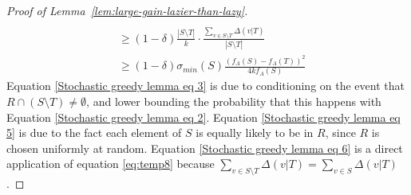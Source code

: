 \documentclass{article}
\begin{document}
\begin{proof}[Proof of Lemma~\ref{lem:large-gain-lazier-than-lazy}]
\begin{align}
\\ &\geq (1 - \delta) \frac{|S \setminus T|}{k} \cdot \frac{\sum_{v \in S \setminus T} \Delta(v | T)}{|S \setminus T|} \label{Stochastic greedy lemma eq 5}
\\ &\geq (1 - \delta) \sigma_{min}(S) \frac{(f_A(S)- f_A(T))^2}{4kf_A(S)} \label{Stochastic greedy lemma eq 6}
\end{align}
Equation \eqref{Stochastic greedy lemma eq 3} is due to conditioning on the event that $R \cap (S \setminus T) \neq \emptyset$, and lower bounding the probability that this happens with Equation \eqref{Stochastic greedy lemma eq 2}. Equation \eqref{Stochastic greedy lemma eq 5} is due to the fact each element of $S$ is equally likely to be in $R$, since $R$ is chosen uniformly at random. Equation \eqref{Stochastic greedy lemma eq 6} is a direct application of equation \eqref{eq:temp8} because $\sum_{v \in S \setminus T} \Delta(v | T) = \sum_{v \in S} \Delta(v | T)$.
\end{proof}
\end{document}
